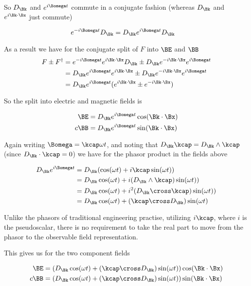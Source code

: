 So $D_\Bk$ and $e^{i\Bomega t}$ commute in a conjugate fashion (whereas $D_\Bk$ and $e^{i\Bk \cdot \Bx}$ just commute)

\begin{align*}
e^{-i\Bomega t} D_\Bk &= D_\Bk e^{i\Bomega t} D_\Bk 
\end{align*}

As a result we have for the conjugate split of $F$ into $\BE$ and $\BB$
\begin{align*}
F \pm F^\dagger 
&= e^{-i\Bomega t} e^{i \Bk \cdot \Bx} D_\Bk \pm D_\Bk e^{-i \Bk \cdot \Bx} e^{i\Bomega t} \\
&= D_\Bk e^{i\Bomega t} e^{i \Bk \cdot \Bx} \pm D_\Bk e^{-i \Bk \cdot \Bx} e^{i\Bomega t} \\
&= D_\Bk e^{i\Bomega t} (e^{i \Bk \cdot \Bx} \pm e^{-i \Bk \cdot \Bx} ) \\
\end{align*}

So the split into electric and magnetic fields is

\begin{align*}
\BE &= D_\Bk e^{i\Bomega t} \cos(\Bk \cdot \Bx) \\
c\BB &= D_\Bk e^{i\Bomega t} \sin(\Bk \cdot \Bx)
\end{align*}

Again writing $\Bomega = \kcap \omega t$, and noting that $D_\Bk \kcap = D_\Bk \wedge \kcap$ (since $D_\Bk \cdot \kcap = 0$) we have for the phasor product in the fields above

\begin{align*}
D_\Bk e^{i\Bomega t} 
&=
D_\Bk (\cos(\omega t) + i\kcap \sin(\omega t)) \\
&=
D_\Bk \cos(\omega t) + i (D_\Bk \wedge \kcap) \sin(\omega t)) \\
&=
D_\Bk \cos(\omega t) + i^2 (D_\Bk \cross \kcap) \sin(\omega t)) \\
&=
D_\Bk \cos(\omega t) + (\kcap \cross D_\Bk) \sin(\omega t) \\
\end{align*}

Unlike the phasors of traditional engineering practise, utilizing $i\kcap$, where $i$ is the pseudoscalar, there
is no requirement to take the real part to move from the phasor to the observable field representation.  

This gives us for the two component fields

\begin{align}\label{eqn:splitFields}
\BE &= \left( D_\Bk \cos(\omega t) + (\kcap \cross D_\Bk) \sin(\omega t) \right) \cos(\Bk \cdot \Bx) \\
c \BB &= \left( D_\Bk \cos(\omega t) + (\kcap \cross D_\Bk) \sin(\omega t) \right) \sin(\Bk \cdot \Bx)
\end{align}

